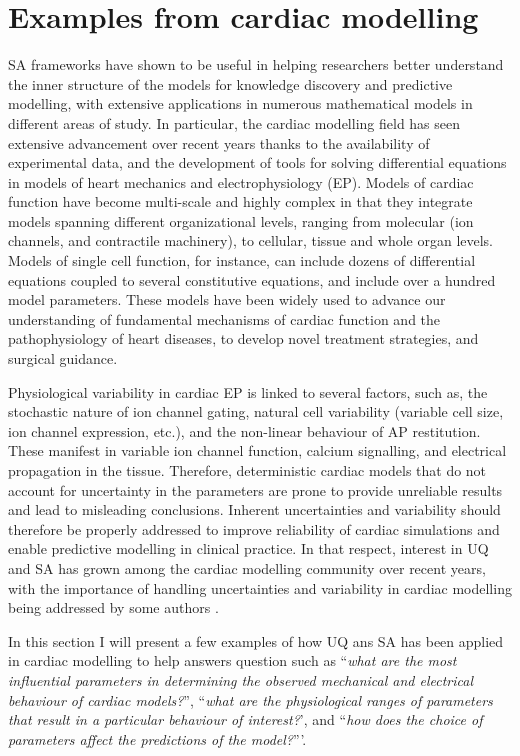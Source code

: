 \documentclass[12pt]{article}
\begin{document}
{\FloatBarrier

\section{Examples from cardiac modelling}

SA frameworks have shown to be useful in helping researchers better understand the inner structure of the models for knowledge discovery and predictive modelling, with extensive applications in numerous mathematical models in  different areas of study. In particular, the cardiac modelling field has seen extensive advancement over recent years thanks to the availability of experimental data, and the development of tools for solving differential equations in models of heart mechanics and electrophysiology (EP).  Models of cardiac function have become multi-scale and highly complex in that they integrate models spanning different organizational levels, ranging from molecular (ion channels, and contractile machinery), to cellular, tissue and whole organ levels. Models of single cell function, for instance, can include dozens of differential equations coupled to several constitutive equations, and include over a hundred model parameters. These models have been widely used to advance our understanding of fundamental mechanisms of cardiac function and the pathophysiology of heart diseases, to develop novel treatment strategies, and surgical guidance.

Physiological variability in cardiac EP is linked to several factors, such as, the stochastic nature of ion channel gating, natural cell variability (variable cell size, ion channel expression, etc.), and the non-linear behaviour of AP restitution. These manifest in variable ion channel function, calcium signalling, and electrical propagation in the tissue.  Therefore, deterministic cardiac models that do not account for uncertainty in the parameters are prone to provide unreliable results and lead to misleading conclusions. Inherent uncertainties and variability should therefore be properly addressed to improve reliability of cardiac simulations and enable predictive modelling in clinical practice.
In that respect, interest in UQ and SA has grown among the cardiac modelling community over recent years, with the importance of handling uncertainties and variability in cardiac modelling being addressed by some authors \cite{HUBERTS201868,Mirams}. 

In this section I will present a few examples of how UQ ans SA has been applied in cardiac modelling to help answers question such as ``\textit{what are the most influential parameters in determining the observed mechanical and electrical behaviour of cardiac models?}'', ``\textit{what are the physiological ranges of parameters that result in a particular behaviour of interest?}', and ``\textit{how does the choice of parameters affect the predictions of the model?}'''. 

}
\end{document}
